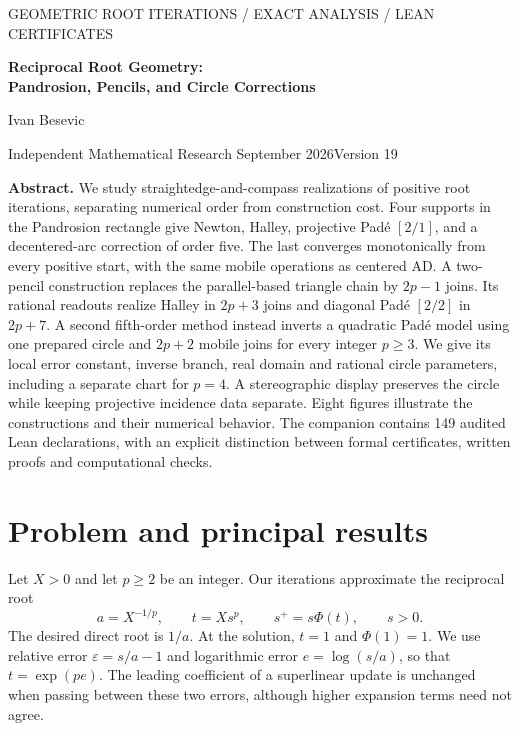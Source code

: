 \documentclass[11pt,a4paper]{article}
\theoremstyle{remark}\newtheorem{remark}[theorem]{Remark}
\begin{document}
\raggedbottom
\thispagestyle{empty}
{\small\sffamily\color{blue} GEOMETRIC ROOT ITERATIONS / EXACT ANALYSIS / LEAN CERTIFICATES}\par
\vspace{7pt}
{\LARGE\bfseries\color{ink} Reciprocal Root Geometry:\\Pandrosion, Pencils, and Circle Corrections\par}
\vspace{8pt}
{\large Ivan Besevic}\par
{\small Independent Mathematical Research\quad\textbullet{} September 2026\quad\textbullet\quad Version 19}\par
\vspace{10pt}
\textbf{Abstract.}
We study straightedge-and-compass realizations of positive root iterations, separating numerical order from construction cost. Four supports in the Pandrosion rectangle give Newton, Halley, projective Pad\'e $[2/1]$, and a decentered-arc correction of order five. The last converges monotonically from every positive start, with the same mobile operations as centered AD. A two-pencil construction replaces the parallel-based triangle chain by $2p-1$ joins. Its rational readouts realize Halley in $2p+3$ joins and diagonal Pad\'e $[2/2]$ in $2p+7$. A second fifth-order method instead inverts a quadratic Pad\'e model using one prepared circle and $2p+2$ mobile joins for every integer $p\ge3$. We give its local error constant, inverse branch, real domain and rational circle parameters, including a separate chart for $p=4$. A stereographic display preserves the circle while keeping projective incidence data separate. Eight figures illustrate the constructions and their numerical behavior. The companion contains 149 audited Lean declarations, with an explicit distinction between formal certificates, written proofs and computational checks.

\section{Problem and principal results}
Let $X>0$ and let $p\ge2$ be an integer. Our iterations approximate the reciprocal root
\begin{equation}\label{eq:state}
 a=X^{-1/p},\qquad t=Xs^p,\qquad s^+=s\Phi(t),\qquad s>0.
\end{equation}
The desired direct root is $1/a$. At the solution, $t=1$ and $\Phi(1)=1$. We use relative error $\varepsilon=s/a-1$ and logarithmic error $e=\log(s/a)$, so that $t=\exp(pe)$. The leading coefficient of a superlinear update is unchanged when passing between these two errors, although higher expansion terms need not agree.
\end{document}
